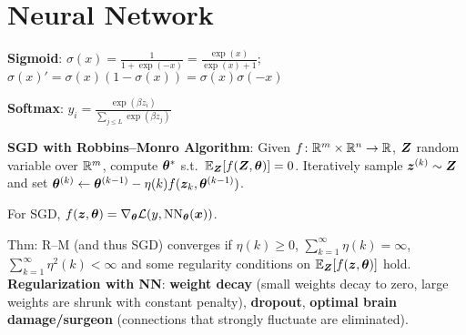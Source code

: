 \section{Neural Network}



\textbf{Sigmoid}:
$\sigma(x) = \frac{1}{1+\exp(-x)} = \frac{\exp(x)}{\exp(x) + 1}$;
$\sigma(x)' = \sigma(x)(1-\sigma(x)) = \sigma(x)\sigma(-x)$

\textbf{Softmax}: $y_i=\frac{\exp(\beta z_i)}{\sum_{j\leq L}\exp(\beta z_j)}$

\textbf{SGD with Robbins--Monro Algorithm}:
Given $f \colon \mathbb R^m \times \mathbb R^n \rightarrow \mathbb R$, $\boldsymbol{Z}$ random variable over $\mathbb R^m$,
compute $\boldsymbol{\theta}^*$ s.t.\ $\mathbb E_{\boldsymbol{Z}}[f(\boldsymbol{Z}, \boldsymbol{\theta})] = 0$.
Iteratively sample $\boldsymbol{z}^{(k)} \sim \boldsymbol{Z}$
and set $\boldsymbol{\theta}^{(k)} \leftarrow \boldsymbol{\theta}^{(k-1)} - \eta(k) f(\boldsymbol{z}_k, \boldsymbol{\theta}^{(k-1)})$.

For SGD, $f(\boldsymbol{z}, \boldsymbol{\theta}) = \nabla_{\boldsymbol{\theta}} \mathcal{L}(y, \operatorname{NN}_{\boldsymbol{\theta}}(\boldsymbol{x}))$.

Thm: R--M (and thus SGD) converges if
$\eta(k) \geq 0$,
$\sum_{k=1}^\infty \eta(k) = \infty$,
$\sum_{k=1}^\infty \eta^2(k) < \infty$
and some regularity conditions on $\mathbb E_{\boldsymbol{Z}}[f(\boldsymbol{z}, \boldsymbol{\theta})]$ hold.\\

\textbf{Regularization with NN}: \textbf{weight decay} (small weights decay to zero, large weights are shrunk with constant penalty), \textbf{dropout}, \textbf{optimal brain damage/surgeon} (connections that strongly fluctuate are eliminated).

